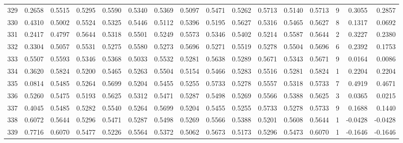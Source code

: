 \begin{tabular}{lrrrrrrrrrrrrrrr}
329 &      0.2658 &  0.5515 &  0.5295 &  0.5590 &  0.5340 &  0.5369 &  0.5097 &  0.5471 &  0.5262 &  0.5713 &   0.5140 &     0.5713 &      9 &                    0.3055 &                     0.2857 \\
330 &      0.4310 &  0.5002 &  0.5524 &  0.5325 &  0.5446 &  0.5112 &  0.5396 &  0.5195 &  0.5627 &  0.5316 &   0.5465 &     0.5627 &      8 &                    0.1317 &                     0.0692 \\
331 &      0.2417 &  0.4797 &  0.5644 &  0.5318 &  0.5501 &  0.5249 &  0.5573 &  0.5346 &  0.5402 &  0.5214 &   0.5587 &     0.5644 &      2 &                    0.3227 &                     0.2380 \\
332 &      0.3304 &  0.5057 &  0.5531 &  0.5275 &  0.5580 &  0.5273 &  0.5696 &  0.5271 &  0.5519 &  0.5278 &   0.5504 &     0.5696 &      6 &                    0.2392 &                     0.1753 \\
333 &      0.5507 &  0.5593 &  0.5346 &  0.5368 &  0.5033 &  0.5532 &  0.5281 &  0.5638 &  0.5289 &  0.5671 &   0.5343 &     0.5671 &      9 &                    0.0164 &                     0.0086 \\
334 &      0.3620 &  0.5824 &  0.5200 &  0.5465 &  0.5263 &  0.5504 &  0.5154 &  0.5466 &  0.5283 &  0.5516 &   0.5281 &     0.5824 &      1 &                    0.2204 &                     0.2204 \\
335 &      0.0814 &  0.5485 &  0.5264 &  0.5699 &  0.5204 &  0.5455 &  0.5255 &  0.5733 &  0.5278 &  0.5557 &   0.5318 &     0.5733 &      7 &                    0.4919 &                     0.4671 \\
336 &      0.5260 &  0.5475 &  0.5193 &  0.5625 &  0.5312 &  0.5471 &  0.5287 &  0.5498 &  0.5269 &  0.5566 &   0.5388 &     0.5625 &      3 &                    0.0365 &                     0.0215 \\
337 &      0.4045 &  0.5485 &  0.5282 &  0.5540 &  0.5264 &  0.5699 &  0.5204 &  0.5455 &  0.5255 &  0.5733 &   0.5278 &     0.5733 &      9 &                    0.1688 &                     0.1440 \\
338 &      0.6072 &  0.5644 &  0.5296 &  0.5471 &  0.5287 &  0.5498 &  0.5269 &  0.5566 &  0.5388 &  0.5201 &   0.5608 &     0.5644 &      1 &                   -0.0428 &                    -0.0428 \\
339 &      0.7716 &  0.6070 &  0.5477 &  0.5226 &  0.5564 &  0.5372 &  0.5062 &  0.5673 &  0.5173 &  0.5296 &   0.5473 &     0.6070 &      1 &                   -0.1646 &                    -0.1646 \\

\end{tabular}
